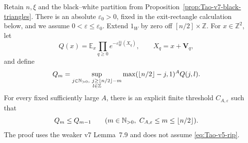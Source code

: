 \begin{proposition}
\label{prop:Tao-v7-renewal-monotonicity}
Retain \(n,\xi\) and the black--white partition from
Proposition~\ref{prop:Tao-v7-black-triangles}.  There is an absolute
\(\varepsilon_0>0\), fixed in the exit-rectangle calculation below, and we
assume \(0<\varepsilon\le\varepsilon_0\).  Extend \(1_W\) by zero off
\([n/2]\times\mathbb Z\).  For \(x\in\mathbb Z^2\), let
\[
 Q(x)=\mathbb E_x\prod_{q\ge0}e^{-\varepsilon^31_W(X_q)},
 \qquad X_q=x+\mathbf V_q,
\]
and define
\[
 Q_m=\sup_{\substack{j\in\mathbb{N}_{>0},\ j\ge\lfloor n/2\rfloor-m\\l\in\mathbb Z}}
 \max(\lfloor n/2\rfloor-j,1)^A Q(j,l).
\]
For every fixed sufficiently large \(A\), there is an explicit finite
threshold \(C_{A,\varepsilon}\) such that
\[
 Q_m\le Q_{m-1}\qquad
 (m\in\mathbb{N}_{>0},\ C_{A,\varepsilon}\le m\le\lfloor n/2\rfloor).
\]
The proof uses the weaker v7 Lemma~7.9 and does not assume
\eqref{eq:Tao-v5-rip}.
\end{proposition}

